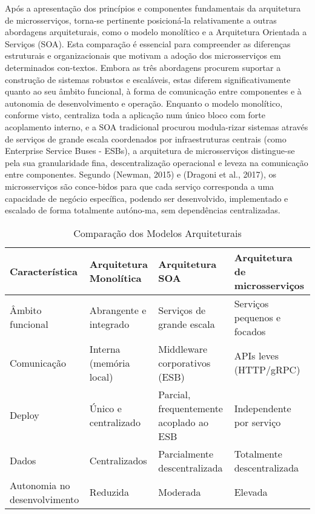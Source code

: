 Após a apresentação dos princípios e componentes fundamentais da arquitetura de microsserviços, torna-se pertinente posicioná-la relativamente a outras abordagens arquiteturais, como o modelo monolítico e a Arquitetura Orientada a Serviços (SOA). Esta comparação é essencial para compreender as diferenças estruturais e organizacionais que motivam a adoção dos microsserviços em determinados con-textos.
Embora as três abordagens procurem suportar a construção de sistemas robustos e escaláveis, estas diferem significativamente quanto ao seu âmbito funcional, à forma de comunicação entre componentes e à autonomia de desenvolvimento e operação.
Enquanto o modelo monolítico, conforme visto, centraliza toda a aplicação num único bloco com forte acoplamento interno, e a SOA tradicional procurou modula-rizar sistemas através de serviços de grande escala coordenados por infraestruturas centrais (como Enterprise Service Buses - ESBs), a arquitetura de microsserviços distingue-se pela sua granularidade fina, descentralização operacional e leveza na comunicação entre componentes.
Segundo (Newman, 2015) e (Dragoni et al., 2017), os microsserviços são conce-bidos para que cada serviço corresponda a uma capacidade de negócio específica, podendo ser desenvolvido, implementado e escalado de forma totalmente autóno-ma, sem dependências centralizadas.


\begin{table}[H]
\centering
\caption{Comparação dos Modelos Arquiteturais}
\label{tab:comparacao_modelos}
\begin{tabular}{|p{4cm}|p{4cm}|p{4cm}|p{4cm}|}
\hline
\textbf{Característica} & \textbf{Arquitetura Monolítica} & \textbf{Arquitetura SOA} & \textbf{Arquitetura de microsserviços} \\
\hline
Âmbito funcional & Abrangente e integrado & Serviços de grande escala & Serviços pequenos e focados \\
\hline
Comunicação & Interna (memória local) & Middleware corporativos (ESB) & APIs leves (HTTP/gRPC) \\
\hline
Deploy & Único e centralizado & Parcial, frequentemente acoplado ao ESB & Independente por serviço \\
\hline
Dados & Centralizados & Parcialmente descentralizada & Totalmente descentralizada \\
\hline
Autonomia no desenvolvimento & Reduzida & Moderada & Elevada \\
\hline
\end{tabular}
\end{table}

